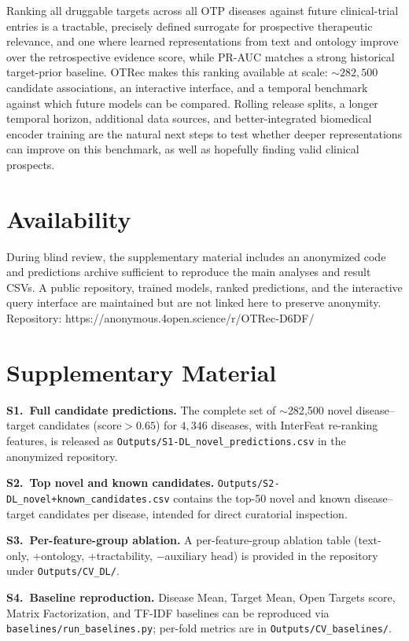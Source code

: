 \documentclass{article}
\begin{document}
Ranking all druggable targets across all OTP diseases against future
clinical-trial entries is a tractable, precisely defined surrogate for
prospective therapeutic relevance, and one where learned representations
from text and ontology improve over the retrospective evidence score, while PR-AUC matches a strong historical target-prior baseline.
OTRec makes this ranking available at scale: ${\sim}282{,}500$
candidate associations, an interactive interface, and a temporal benchmark against which future models can be compared.
Rolling release splits, a longer temporal horizon, additional data sources, and better-integrated
biomedical encoder training are the natural next steps to test whether
deeper representations can improve on this benchmark, as well as hopefully finding valid clinical prospects.

\section*{Availability}

During blind review, the supplementary material includes an
anonymized code and predictions archive sufficient to reproduce the
main analyses and result CSVs. A public repository, trained models,
ranked predictions, and the interactive query interface are
maintained but are not linked here to preserve anonymity.
Repository: https://anonymous.4open.science/r/OTRec-D6DF/




\appendix
\section*{Supplementary Material}
\label{sec:supp}

\textbf{S1.\ Full candidate predictions.}
The complete set of $\sim$282{,}500 novel disease--target candidates
(score${>}0.65$) for $4{,}346$ diseases, with InterFeat re-ranking
features, is released as
\texttt{Outputs/S1-DL\_novel\_predictions.csv} in the anonymized
repository.

\textbf{S2.\ Top novel and known candidates.}
\texttt{Outputs/S2-DL\_novel+known\_candidates.csv} contains the
top-50 novel and known disease--target candidates per disease,
intended for direct curatorial inspection.

\textbf{S3.\ Per-feature-group ablation.}
A per-feature-group ablation table (text-only, +ontology, +tractability,
$-$auxiliary head) is provided in the repository under
\texttt{Outputs/CV\_DL/}.

\textbf{S4.\ Baseline reproduction.}
Disease Mean, Target Mean, Open Targets score, Matrix Factorization,
and TF-IDF baselines can be reproduced via
\texttt{baselines/run\_baselines.py}; per-fold metrics are in
\texttt{Outputs/CV\_baselines/}.


\end{document}
